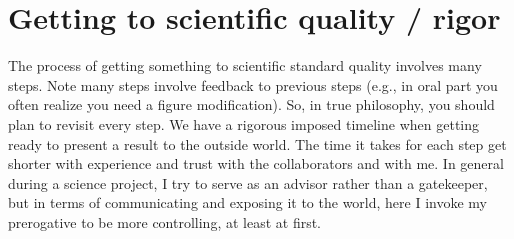 \documentclass[letterpaper,10pt,english]{sphinxmanual}
\begin{document}
\section{Getting to scientific quality / rigor}
\label{\detokenize{02Elements:getting-to-scientific-quality-rigor}}
\sphinxAtStartPar
The process of getting something to scientific standard quality involves many steps.
Note many steps involve feedback to previous steps (e.g., in oral part you often realize you need a figure modification).
So, in true {\hyperref[\detokenize{03CodersAtWork:codersatwork}]{}} philosophy, you should plan to revisit every step.
We have a rigorous imposed timeline when getting ready to present a result to the outside world.
The time it takes for each step get shorter with experience and trust with the collaborators and with me.
In general during a science project, I try to serve as an advisor rather than a gatekeeper, but in terms of communicating and exposing it to the world, here I invoke my prerogative to be more controlling, at least at first.
\end{document}
